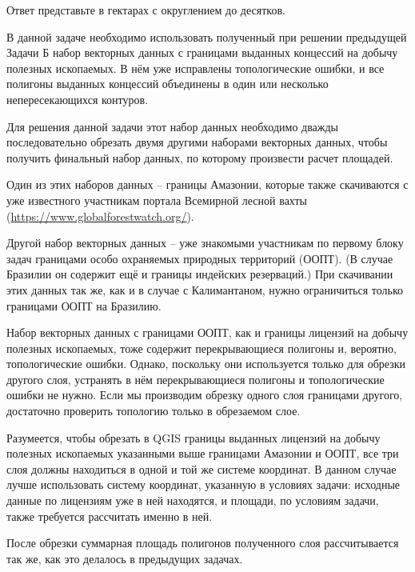 Ответ представьте в гектарах с округлением до десятков.

\explanationSection

В данной задаче необходимо использовать полученный при решении предыдущей Задачи Б набор векторных данных с границами выданных концессий на добычу полезных ископаемых. В нём уже исправлены топологические ошибки, и все полигоны выданных концессий объединены в один или несколько непересекающихся контуров.

Для решения данной задачи этот набор данных необходимо дважды последовательно обрезать двумя другими наборами векторных данных, чтобы получить финальный набор данных, по которому произвести расчет площадей.

Один из этих наборов данных – границы Амазонии, которые также скачиваются с уже известного участникам портала Всемирной лесной вахты (\url{https://www.globalforestwatch.org/}).

Другой набор векторных данных – уже знакомыми участникам по первому блоку задач границами особо охраняемых природных территорий (ООПТ). (В случае Бразилии он содержит ещё и границы индейских резерваций.) При скачивании этих данных так же, как и в случае с Калимантаном, нужно ограничиться только границами ООПТ на Бразилию.

Набор векторных данных с границами ООПТ, как и границы лицензий на добычу полезных ископаемых, тоже содержит перекрывающиеся полигоны и, вероятно, топологические ошибки. Однако, поскольку они используется только для обрезки другого слоя, устранять в нём перекрывающиеся полигоны и топологические ошибки не нужно. Если мы производим обрезку одного слоя границами другого, достаточно проверить топологию только в обрезаемом слое.

Разумеется, чтобы обрезать в QGIS границы выданных лицензий на добычу полезных ископаемых указанными выше границами Амазонии и ООПТ, все три слоя должны находиться в одной и той же системе координат. В данном случае лучше использовать систему координат, указанную в условиях задачи: исходные данные по лицензиям уже в ней находятся, и площади, по условиям задачи, также требуется рассчитать именно в ней.

После обрезки суммарная площадь полигонов полученного слоя рассчитывается так же, как это делалось в предыдущих задачах.


